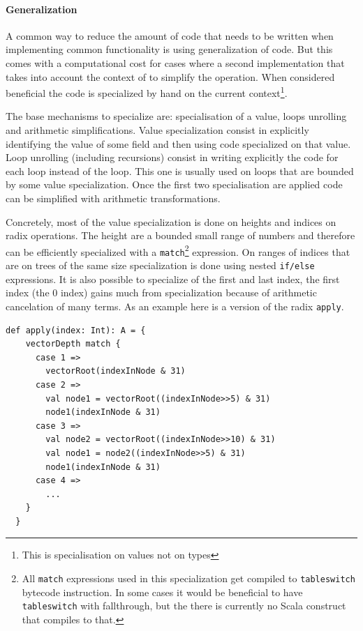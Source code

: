 \paragraph{Generalization}
A common way to reduce the amount of code that needs to be written when implementing common functionality is using generalization of code. But this comes with a computational cost for cases where a second implementation that takes into account the context of to simplify the operation. When considered beneficial the code is specialized by hand on the current context\footnote{This is specialisation on values not on types}. 

The base mechanisms to specialize are: specialisation of a value, loops unrolling and arithmetic simplifications. Value specialization consist in explicitly identifying the value of some field and then using code specialized on that value. Loop unrolling (including recursions) consist in writing explicitly the code for each loop instead of the loop. This one is usually used on loops that are bounded by some value specialization. Once the first two specialisation are applied code can be simplified with arithmetic transformations. 

Concretely, most of the value specialization is done on heights and indices on radix operations. The height are a bounded small range of numbers and therefore can be efficiently specialized with a \texttt{match}\footnote{All \texttt{match} expressions used in this specialization get compiled to \texttt{tableswitch} bytecode instruction. In some cases it would be beneficial to have  \texttt{tableswitch} with fallthrough, but the there is currently no Scala construct that compiles to that.} expression. On ranges of indices that are on trees of the same size specialization is done using nested \texttt{if/else} expressions. It is also possible to specialize of the first and last index, the first index (the 0 index) gains much from specialization because of arithmetic cancelation of many terms. As an example here is a version of the radix \texttt{apply}. 

\begin{lstlisting}[frame=single]
def apply(index: Int): A = {
    vectorDepth match {
      case 1 => 
        vectorRoot(indexInNode & 31)
      case 2 => 
        val node1 = vectorRoot((indexInNode>>5) & 31)
        node1(indexInNode & 31)
      case 3 => 
        val node2 = vectorRoot((indexInNode>>10) & 31)
        val node1 = node2((indexInNode>>5) & 31)
        node1(indexInNode & 31)
      case 4 =>
        ...
    }
  }
\end{lstlisting}

